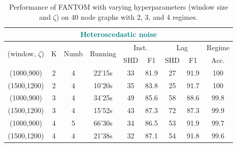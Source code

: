 \begin{table}[H]
\centering
\caption{Performance of FANTOM with varying hyperparameters (window size and $\zeta$) on 40 node graphs with 2, 3, and 4 regimes.}
\begin{tabular}{@{}ccccccccc@{}}
\toprule
\multicolumn{9}{c}{\textcolor{teal}{Heteroscedastic noise}}                                                                                                                                                                            \\ \midrule
\multicolumn{1}{c|}{\multirow{2}{*}{(window, $\zeta$)}} & \multirow{2}{*}{K} & \multirow{2}{*}{Numb} & \multicolumn{1}{c|}{\multirow{2}{*}{Running}} & \multicolumn{2}{c|}{Inst.}    & \multicolumn{2}{c|}{Lag}      & Regime \\ \cmidrule(lr){5-8}
\multicolumn{1}{c|}{}                                   &                    &                       & \multicolumn{1}{c|}{}                         & SHD & \multicolumn{1}{c|}{F1} & SHD & \multicolumn{1}{c|}{F1} & Acc.   \\ \midrule
\multicolumn{1}{c|}{(1000,900)}                         & 2                  & 4                     & \multicolumn{1}{c|}{22'15s}                   & 33  & 81.9                    & 27  & \multicolumn{1}{c|}{91.9 }                   & 100    \\
\multicolumn{1}{c|}{(1500,1200)}                        & 2                  & 4                     & \multicolumn{1}{c|}{10'20s}                   & 35  & 83.8                    & 25  & \multicolumn{1}{c|}{91.7}                    & 100    \\ \midrule
\multicolumn{1}{c|}{(1000,900)}                         & 3                  & 4                     & \multicolumn{1}{c|}{34'25s}                   & 49  & 85.6                    & 58  & \multicolumn{1}{c|}{88.6}                    & 99.8   \\
\multicolumn{1}{c|}{(1500,1200)}                        & 3                  & 4                     & \multicolumn{1}{c|}{15'52s}                   & 43  & 87.3                    & 72  & \multicolumn{1}{c|}{87.3}                    & 99.9   \\ \midrule
\multicolumn{1}{c|}{(1000,900)}                         & 4                  & 5                     & \multicolumn{1}{c|}{66'30s}                   & 34  & 86.5                    & 53  & \multicolumn{1}{c|}{91.9}                    & 99.7   \\ 

\multicolumn{1}{c|}{(1500,1200)}                        & 4                  & 4                     & \multicolumn{1}{c|}{21'38s}                   & 32  & 87.1                    & 54  & \multicolumn{1}{c|}{91.8 }                   & 99.6   \\ \bottomrule
\end{tabular}
\label{hetero_tab_time_40}
\end{table}
